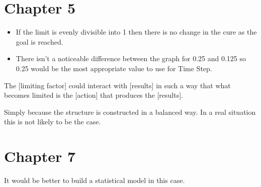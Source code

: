 \documentclass[]{memoir}
\begin{document}
\section{Chapter 5}


\begin{itemize}
\itemsep1pt\parskip0pt
\item
  If the limit is evenly divisible into 1 then there is no change in the
  cure as the goal is reached.
\item
  There isn't a noticeable difference between the graph for 0.25 and
  0.125 so 0.25 would be the most appropriate value to use for Time
  Step.
\end{itemize}


The {[}limiting factor{]} could interact with {[}results{]} in such a
way that what becomes limited is the {[}action{]} that produces the
{[}results{]}.


Simply because the structure is constructed in a balanced way. In a real
situation this is not likely to be the case.

\section{Chapter 7}


It would be better to build a statistical model in this case.

\end{document}
